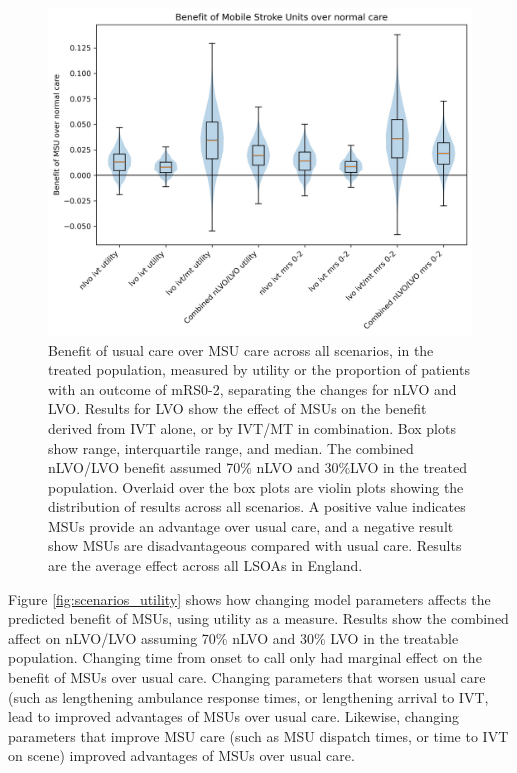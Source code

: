 \begin{figure}[h!]
    \centering
    \includegraphics[width=0.6\linewidth]{images/scenario_results_summary.png}
    \caption{Benefit of usual care over MSU care across all scenarios, in the treated population, measured by utility or the proportion of patients with an outcome of mRS0-2, separating the changes for nLVO and LVO. Results for LVO show the effect of MSUs on the benefit derived from IVT alone, or by IVT/MT in combination. Box plots show range, interquartile range, and median. The combined nLVO/LVO benefit assumed 70\% nLVO and 30\%LVO in the treated population. Overlaid over the box plots are violin plots showing the distribution of results across all scenarios. A positive value indicates MSUs provide an advantage over usual care, and a negative result show MSUs are disadvantageous compared with usual care. Results are the average effect across all LSOAs in England.}
    \label{fig:scenarios_overview}
\end{figure}



Figure \ref{fig:scenarios_utility} shows how changing model parameters affects the predicted benefit of MSUs, using utility as a measure. Results show the combined affect on nLVO/LVO assuming 70\% nLVO and 30\% LVO  in the treatable population. Changing time from onset to call only had marginal effect on the benefit of MSUs over usual care. Changing parameters that worsen usual care (such as lengthening ambulance response times, or lengthening arrival to IVT, lead to improved advantages of MSUs over usual care. Likewise, changing parameters that improve MSU care (such as MSU dispatch times, or time to IVT on scene) improved advantages of MSUs over usual care.

